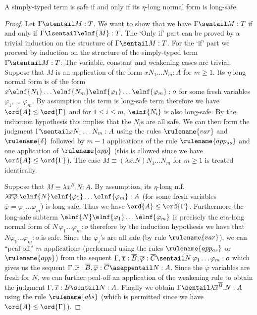 \begin{lemma}
  \label{lem:safe_iff_etalong_lsafe}
  A simply-typed term is safe if and only if its $\eta$-long normal form is long-safe.
\end{lemma}
\begin{proof}
Let $\Gamma \stentail M : T$. We want to show that we have $\Gamma \sentail M : T$ if and only if $\Gamma \lsentail \elnf{M} : T$. The
`Only if' part can be proved by a trivial induction on the structure of
$\Gamma \sentail M : T$. For the `if' part we proceed by
induction on the structure of the simply-typed term $\Gamma
\stentail M : T$: The variable, constant and weakening cases are
trivial. Suppose that $M$ is an application of the form $x N_1
\ldots N_m : A$ for $m\geq 1$. Its $\eta$-long normal form is of the
form $x \elnf{N_1} \ldots \elnf{N_m} \elnf{\varphi_1} \ldots
\elnf{\varphi_m}: o$ for some fresh variables $\varphi_1$, \ldots
$\varphi_m$. By assumption this term is long-safe term therefore we
have $\ord{A}\leq\ord{\Gamma}$ and for $1\leq i \leq m$,
$\elnf{N_i}$ is also long-safe. By the induction hypothesis this
implies that the $N_i$s are all safe. We can then form the judgment
$\Gamma \sentail x N_1 \ldots N_m : A$ using the rules
$\rulename{var}$ and $\rulename{\delta}$ followed by $m-1$
applications of the rule $\rulename{app_{as}}$ and one application
of $\rulename{app}$ (this is allowed since we have
$\ord{A}\leq\ord{\Gamma}$). The case $M\equiv (\lambda x. N) N_1
\ldots N_m$ for $m\geq 1$ is treated identically.

Suppose that $M \equiv \lambda \overline{x}^{\overline B} . N : A$. By assumption,
its  $\eta$-long n.f.\ $\lambda \overline{x} \overline{\varphi} .
\elnf{N} \elnf{\varphi_1} \ldots \elnf{\varphi_m}: A$ (for some
fresh variables $\overline\varphi = \varphi_1 \ldots \varphi_m$) is long-safe. Thus
we have $\ord{A}\leq\ord{\Gamma}$. Furthermore the long-safe subterm
$\elnf{N} \elnf{\varphi_1} \ldots \elnf{\varphi_m}$ is precisely the
eta-long normal form of $N\, \varphi_1 \ldots \varphi_m : o$ therefore by
the induction hypothesis we have that $N \varphi_1 \ldots \varphi_m
:o$ is safe. Since the $\varphi_i$'s are all safe (by rule
$\rulename{var}$), we can ``peal-off'' $m$ applications (performed using
the rules $\rulename{app_{as}}$ or $\rulename{app}$) from the sequent $\Gamma,
\overline{x}:\overline B,
\overline{\varphi}:\overline C \sentail N\, \varphi_1 \ldots
\varphi_m :o$ which gives us the sequent $\Gamma, \overline{x}:\overline B,
\overline{\varphi}:\overline C \asappentail N : A$. Since the $\overline{\varphi}$
variables are fresh for $N$, we can further peal-off an
application of the weakening rule to obtain the judgment $\Gamma,
\overline{x}:\overline B \sentail N : A$. Finally we obtain $\Gamma \sentail
\lambda \overline{x}^{\overline{B}} . N : A$ using the rule $\rulename{abs}$ (which
is permitted since we have $\ord{A}\leq\ord{\Gamma}$).
\end{proof}



